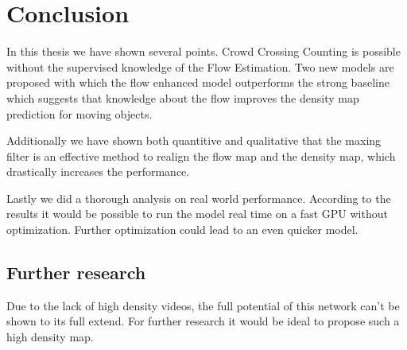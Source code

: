 \chapter{Conclusion}
In this thesis we have shown several points. Crowd Crossing Counting is possible without the supervised knowledge of the Flow Estimation. Two new models are proposed with which the flow enhanced model outperforms the strong baseline which suggests that knowledge about the flow improves the density map prediction for moving objects.

Additionally we have shown both quantitive and qualitative that the maxing filter is an effective method to realign the flow map and the density map, which drastically increases the performance.

Lastly we did a thorough analysis on real world performance. According to the results it would be possible to run the model real time on a fast GPU without optimization. Further optimization could lead to an even quicker model.


\section{Further research}
Due to the lack of high density videos, the full potential of this network can't be shown to its full extend. For further research it would be ideal to propose such a high density map.